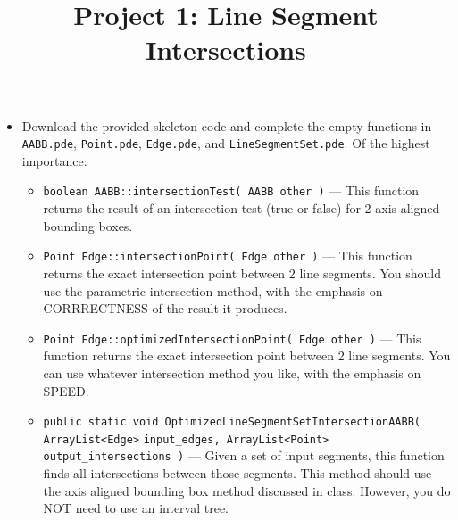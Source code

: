\documentclass[a4paper,12pt]{article}
\title{Project 1: Line Segment Intersections}
\begin{document}
\maketitle

\projectGroundRules

\projectSubmission

\assignmentInstructions


\begin{itemize}

\item Download the provided skeleton code and complete the empty functions in \texttt{AABB.pde}, \texttt{Point.pde}, \texttt{Edge.pde}, and \texttt{LineSegmentSet.pde}. Of the highest importance:

\begin{itemize}
   \item \texttt{boolean AABB::intersectionTest( AABB other )} --- This function returns the result of an intersection test (true or false) for 2 axis aligned bounding boxes.
   
   \item \texttt{Point Edge::intersectionPoint( Edge other )} --- This function returns the exact intersection point between 2 line segments. You should use the parametric intersection method, with the emphasis on CORRRECTNESS of the result it produces.
   
   \item \texttt{Point Edge::optimizedIntersectionPoint( Edge other )} --- This function returns the exact intersection point between 2 line segments. You can use whatever intersection method you like, with the emphasis on SPEED.
   
\item \texttt{public static void OptimizedLineSegmentSetIntersectionAABB( 
ArrayList<Edge>} \linebreak
\texttt{input\_edges, ArrayList<Point> output\_intersections )} --- Given a set of input segments, this function finds all intersections between those segments. This method should use the axis aligned bounding box method discussed in class. However, you do NOT need to use an interval tree.

   

\end{itemize}
\end{itemize}
\end{document}
